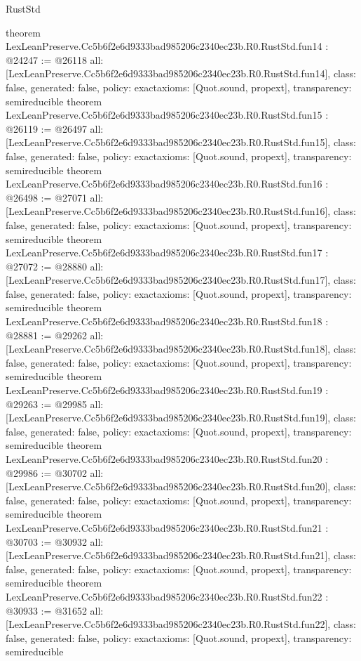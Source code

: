 \begin{lexlean}{RustStd}
\begin{coremodule}
{}
theorem LexLeanPreserve.Cc5b6f2e6d9333bad985206c2340ec23b.R0.RustStd.fun14 : @24247 := @26118 {
  all: [LexLeanPreserve.Cc5b6f2e6d9333bad985206c2340ec23b.R0.RustStd.fun14],
  class: false,
  generated: false,
  policy: exact{axioms: [Quot.sound, propext]},
  transparency: semireducible
}
theorem LexLeanPreserve.Cc5b6f2e6d9333bad985206c2340ec23b.R0.RustStd.fun15 : @26119 := @26497 {
  all: [LexLeanPreserve.Cc5b6f2e6d9333bad985206c2340ec23b.R0.RustStd.fun15],
  class: false,
  generated: false,
  policy: exact{axioms: [Quot.sound, propext]},
  transparency: semireducible
}
theorem LexLeanPreserve.Cc5b6f2e6d9333bad985206c2340ec23b.R0.RustStd.fun16 : @26498 := @27071 {
  all: [LexLeanPreserve.Cc5b6f2e6d9333bad985206c2340ec23b.R0.RustStd.fun16],
  class: false,
  generated: false,
  policy: exact{axioms: [Quot.sound, propext]},
  transparency: semireducible
}
theorem LexLeanPreserve.Cc5b6f2e6d9333bad985206c2340ec23b.R0.RustStd.fun17 : @27072 := @28880 {
  all: [LexLeanPreserve.Cc5b6f2e6d9333bad985206c2340ec23b.R0.RustStd.fun17],
  class: false,
  generated: false,
  policy: exact{axioms: [Quot.sound, propext]},
  transparency: semireducible
}
theorem LexLeanPreserve.Cc5b6f2e6d9333bad985206c2340ec23b.R0.RustStd.fun18 : @28881 := @29262 {
  all: [LexLeanPreserve.Cc5b6f2e6d9333bad985206c2340ec23b.R0.RustStd.fun18],
  class: false,
  generated: false,
  policy: exact{axioms: [Quot.sound, propext]},
  transparency: semireducible
}
theorem LexLeanPreserve.Cc5b6f2e6d9333bad985206c2340ec23b.R0.RustStd.fun19 : @29263 := @29985 {
  all: [LexLeanPreserve.Cc5b6f2e6d9333bad985206c2340ec23b.R0.RustStd.fun19],
  class: false,
  generated: false,
  policy: exact{axioms: [Quot.sound, propext]},
  transparency: semireducible
}
theorem LexLeanPreserve.Cc5b6f2e6d9333bad985206c2340ec23b.R0.RustStd.fun20 : @29986 := @30702 {
  all: [LexLeanPreserve.Cc5b6f2e6d9333bad985206c2340ec23b.R0.RustStd.fun20],
  class: false,
  generated: false,
  policy: exact{axioms: [Quot.sound, propext]},
  transparency: semireducible
}
theorem LexLeanPreserve.Cc5b6f2e6d9333bad985206c2340ec23b.R0.RustStd.fun21 : @30703 := @30932 {
  all: [LexLeanPreserve.Cc5b6f2e6d9333bad985206c2340ec23b.R0.RustStd.fun21],
  class: false,
  generated: false,
  policy: exact{axioms: [Quot.sound, propext]},
  transparency: semireducible
}
theorem LexLeanPreserve.Cc5b6f2e6d9333bad985206c2340ec23b.R0.RustStd.fun22 : @30933 := @31652 {
  all: [LexLeanPreserve.Cc5b6f2e6d9333bad985206c2340ec23b.R0.RustStd.fun22],
  class: false,
  generated: false,
  policy: exact{axioms: [Quot.sound, propext]},
  transparency: semireducible
}
\end{coremodule}
\end{lexlean}
